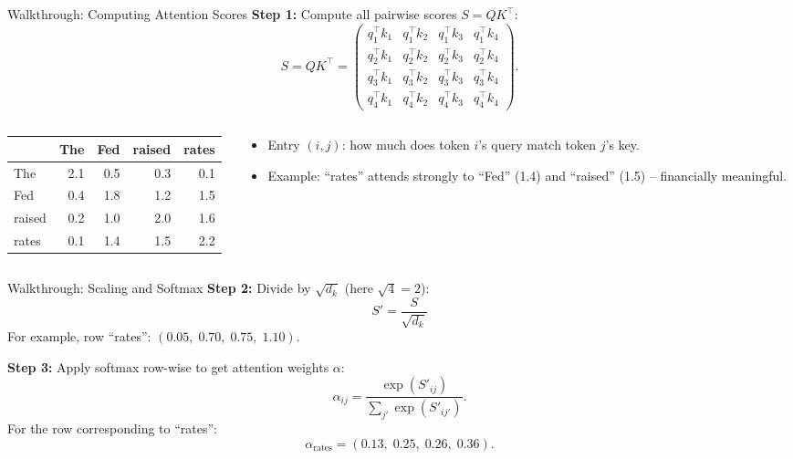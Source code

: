 \documentclass[aspectratio=169]{beamer}
\begin{document}
\begin{frame}{Walkthrough: Computing Attention Scores}
  \textbf{Step 1:} Compute all pairwise scores $S = QK^\top$:
  \[
    S = QK^\top =
    \begin{pmatrix}
      q_1^\top k_1 & q_1^\top k_2 & q_1^\top k_3 & q_1^\top k_4 \\
      q_2^\top k_1 & q_2^\top k_2 & q_2^\top k_3 & q_2^\top k_4 \\
      q_3^\top k_1 & q_3^\top k_2 & q_3^\top k_3 & q_3^\top k_4 \\
      q_4^\top k_1 & q_4^\top k_2 & q_4^\top k_3 & q_4^\top k_4
    \end{pmatrix}.
  \]

  \begin{columns}[t]
    \begin{column}{0.52\textwidth}
      \begin{center}
      {\small
      \begin{tabular}{lrrrr}
        \toprule
               & The  & Fed  & raised & rates \\
        \midrule
        The    & 2.1  & 0.5  & 0.3    & 0.1   \\
        Fed    & 0.4  & 1.8  & 1.2    & 1.5   \\
        raised & 0.2  & 1.0  & 2.0    & 1.6   \\
        rates  & 0.1  & 1.4  & 1.5    & 2.2   \\
        \bottomrule
      \end{tabular}}
      \end{center}
    \end{column}
    \begin{column}{0.44\textwidth}
      \begin{itemize}
        \item Entry $(i,j)$: how much does token $i$'s query match token $j$'s key.
        \item Example: ``rates'' attends strongly to ``Fed'' (1.4) and ``raised''
              (1.5) – financially meaningful.
      \end{itemize}
    \end{column}
  \end{columns}
\end{frame}
%
%
\begin{frame}{Walkthrough: Scaling and Softmax}
  \textbf{Step 2:} Divide by $\sqrt{d_k}$ (here $\sqrt{4}=2$):
  \[
    S' = \frac{S}{\sqrt{d_k}}
  \]
  For example, row ``rates'': $(0.05,\;0.70,\;0.75,\;1.10)$.

  \vspace{0.5em}
  \textbf{Step 3:} Apply softmax row-wise to get attention weights $\alpha$:
  \[
    \alpha_{ij} =
    \frac{\exp(S'_{ij})}{\displaystyle\sum_{j'}\exp(S'_{ij'})}.
  \]
  For the row corresponding to ``rates'':
  \[
    \alpha_{\text{rates}} = (0.13,\;0.25,\;0.26,\;0.36).
  \]
\end{frame}
\end{document}
